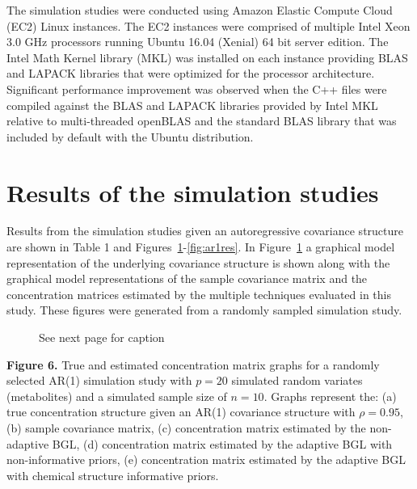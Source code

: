 \begin{DoubleSpace}
The simulation studies were conducted using Amazon Elastic Compute Cloud (EC2) Linux instances. The EC2 instances were comprised of multiple Intel Xeon 3.0 GHz processors running Ubuntu 16.04 (Xenial) 64 bit server edition. The Intel Math Kernel library (MKL) was installed on each instance providing BLAS and LAPACK libraries that were optimized for the processor architecture. Significant performance improvement was observed when the C++ files were compiled against the BLAS and LAPACK libraries provided by Intel MKL relative to multi-threaded openBLAS and the standard BLAS library that was included by default with the Ubuntu distribution. 

\section{Results of the simulation studies}
Results from the simulation studies given an autoregressive covariance structure are shown in Table 1 and Figures~\ref{fig:ar1}-\ref{fig:ar1res}. In Figure~\ref{fig:ar1} a graphical model representation of the underlying covariance structure is shown along with the graphical model representations of the sample covariance matrix and the concentration matrices estimated by the multiple techniques evaluated in this study. These figures were generated from a randomly sampled simulation study. 

\begin{landscape}
\begin{figure}[H]
	\caption[Graphical models from a randomly selected AR(1) simulation study]{See next page for caption \label{fig:ar1} }
\end{figure}
\end{landscape}

\textbf{Figure 6.} True and estimated concentration matrix graphs for a randomly selected AR(1) simulation study with $p=20$ simulated random variates (metabolites) and a simulated sample size of $n=10$. Graphs represent the: (a) true concentration structure given an AR(1) covariance structure with $\rho=0.95$, (b) sample covariance matrix, (c) concentration matrix estimated by the non-adaptive BGL, (d) concentration matrix estimated by the adaptive BGL with non-informative priors, (e) concentration matrix estimated by the adaptive BGL with chemical structure informative priors.


\end{DoubleSpace}

